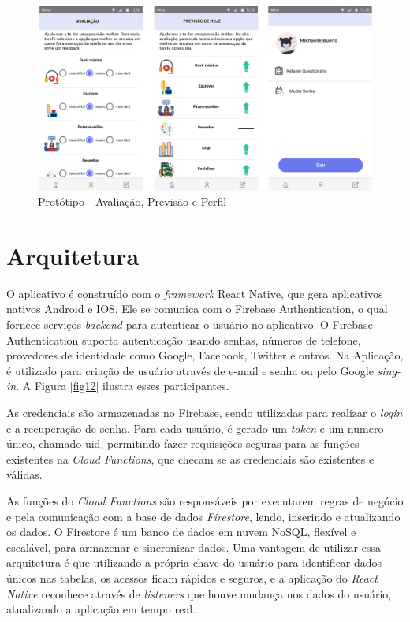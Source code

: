 \begin{figure}[ht]
	\caption{Protótipo - Avaliação, Previsão e Perfil}
	\begin{center}
	\includegraphics[keepaspectratio=true,scale=0.3]{figuras/prototipo3-v.png}
	\end{center}
    \label{fig11}
\end{figure}

\section{Arquitetura}

O aplicativo é construído com o \emph{framework} React Native, que gera aplicativos nativos Android e IOS. 
Ele se comunica com o Firebase Authentication, o qual fornece serviços \emph{backend} para autenticar 
o usuário no aplicativo. O Firebase Authentication suporta 
autenticação usando senhas, números de telefone, provedores de identidade como Google, Facebook, Twitter e 
outros. Na Aplicação, é utilizado para criação de usuário através de e-mail e senha ou 
pelo Google \emph{sing-in}. A Figura \ref{fig12} ilustra esses participantes.

As credenciais são armazenadas no Firebase, sendo utilizadas para realizar o 
\emph{login} e a recuperação de senha. Para cada usuário, é gerado um \emph{token} e um numero único, chamado uid, permitindo 
fazer requisições seguras para as funções existentes na \emph{Cloud Functions}, que checam se as credenciais 
são existentes e válidas.

As funções do \emph{Cloud Functions} são responsáveis por executarem regras de negócio e 
pela comunicação com a base de dados \emph{Firestore}, lendo, inserindo e atualizando os dados. 
O Firestore é um banco de dados em nuvem NoSQL, flexível e escalável, para armazenar e sincronizar dados.
Uma vantagem de utilizar essa arquitetura é que utilizando a própria chave do usuário para identificar 
dados únicos nas tabelas, os acessos ficam rápidos e seguros, e a aplicação do \emph{React Native} reconhece 
através de \emph{listeners} que houve mudança nos dados do usuário, atualizando a aplicação em tempo real.
 
